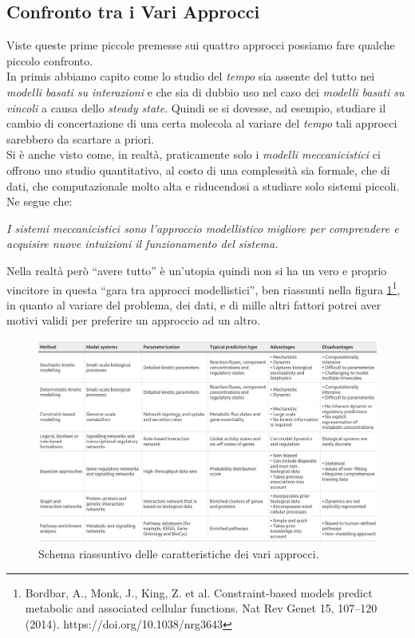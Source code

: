 \documentclass[a4paper,12pt, oneside]{book}
\begin{document}
\subsection{Confronto tra i Vari Approcci}
Viste queste prime piccole premesse sui quattro approcci possiamo fare qualche
piccolo confronto. \\
In primis abbiamo capito come lo studio del \textit{tempo} sia assente del tutto
nei \textit{modelli basati su interazioni} e che sia di dubbio uso nel caso dei
\textit{modelli basati su vincoli} a causa dello \textit{steady state}. Quindi
se si dovesse, ad esempio, studiare il cambio di concertazione di una certa
molecola al variare del \textit{tempo} tali approcci sarebbero da scartare a
priori.\\
Si è anche visto come, in realtà, praticamente solo i \textit{modelli
  meccanicistici} ci offrono uno studio quantitativo, al costo di una
complessità sia formale, che di dati, che computazionale molto alta e
riducendosi a studiare solo sistemi piccoli. Ne segue che:
\begin{center}
  \textit{I sistemi meccanicistici sono l'approccio modellistico migliore per
    comprendere e acquisire nuove intuizioni il funzionamento del sistema.} 
\end{center}
Nella realtà però ``avere tutto'' è un'utopia quindi non si ha un vero e proprio
vincitore in questa ``gara tra approcci modellistici'', ben riassunti nella
figura \ref{fig:app}\footnote{Bordbar, A., Monk, J., King, Z. et
  al. Constraint-based models predict metabolic and associated cellular
  functions. Nat Rev Genet 15, 107–120 (2014). https://doi.org/10.1038/nrg3643},
in quanto al variare del problema, dei dati, e di mille altri fattori potrei
aver motivi validi per preferire un approccio ad un altro.\\
\begin{figure}
  \centering
  \includegraphics[width = \textwidth]{img/apptable.jpg}
  \caption{Schema riassuntivo delle caratteristiche dei vari approcci.}
  \label{fig:app}
\end{figure}
\end{document}
